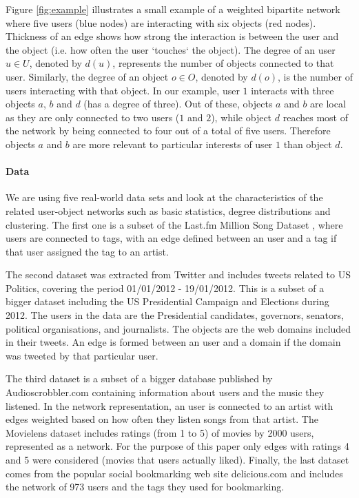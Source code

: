 Figure \ref{fig:example} illustrates a small example of a weighted bipartite
network where five users (blue nodes) are interacting with six objects (red
nodes). Thickness of an edge shows how strong the interaction is between the
user and the object (i.e. how often the user `touches` the object). The degree
of an user $u \in U$, denoted by $d(u)$, represents the number of objects
connected to that user. Similarly, the degree of an object $o \in O$, denoted by
$d(o)$, is the number of users interacting with that object. In our example,
user $1$ interacts with three objects $a$, $b$ and $d$ (has a degree of three).
Out of these, objects $a$ and $b$ are local as they are only connected to two
users ($1$ and $2$), while object $d$ reaches most of the network by being
connected to four out of a total of five users. Therefore objects $a$ and $b$
are more relevant to particular interests of user $1$ than object $d$.

\paragraph{Data}

We are using five real-world data sets and look at the characteristics of the
related user-object networks such as basic statistics, degree distributions and
clustering. The first one is a subset of the Last.fm Million Song Dataset
\citep{Bertin-Mahieux2011}, where users are connected to tags, with an edge
defined between an user and a tag if that user assigned the tag to an artist.

The second dataset was extracted from Twitter and includes tweets related to US
Politics, covering the period 01/01/2012 - 19/01/2012. This is a subset of a
bigger dataset including the US Presidential Campaign and Elections during
2012. The users in the data are the Presidential candidates, governors,
senators, political organisations, and journalists. The objects are the web
domains included in their tweets. An edge is formed between an user and a domain
if the domain was tweeted by that particular user.

The third dataset is a subset of a bigger database published by
Audioscrobbler.com containing information about users and the music they
listened. In the network representation, an user is connected to an artist
with edges weighted based on how often they listen songs from that artist. The
Movielens dataset includes ratings (from 1 to 5) of movies by 2000 users,
represented as a network. For the purpose of this paper only edges with ratings 4 and 5
were considered (movies that users actually liked). Finally, the last dataset
comes from the popular social bookmarking web site delicious.com and includes
the network of 973 users and the tags they used for bookmarking.

